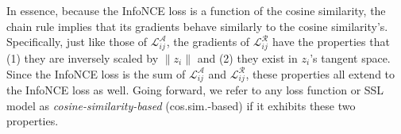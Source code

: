 In essence, because the InfoNCE loss is a function of the cosine similarity, the chain rule implies that its gradients behave similarly to the cosine similarity's. Specifically, just like those of $\mathcal{L}_{ij}^\mathcal{A}$, the gradients of $\mathcal{L}_{ij}^\mathcal{R}$ have the properties that (1) they are inversely scaled by $\|z_i\|$ and (2) they exist in $z_i$'s tangent space. Since the InfoNCE loss is the sum of $\mathcal{L}_{ij}^\mathcal{A}$ and $\mathcal{L}_{ij}^\mathcal{R}$, these properties all extend to the InfoNCE loss as well. Going forward, we refer to any loss function or SSL model as \emph{cosine-similarity-based} (cos.sim.-based) if it exhibits these two properties.

\begin{figure*}
    \centering \hspace*{-0.3cm}
\end{figure*}
